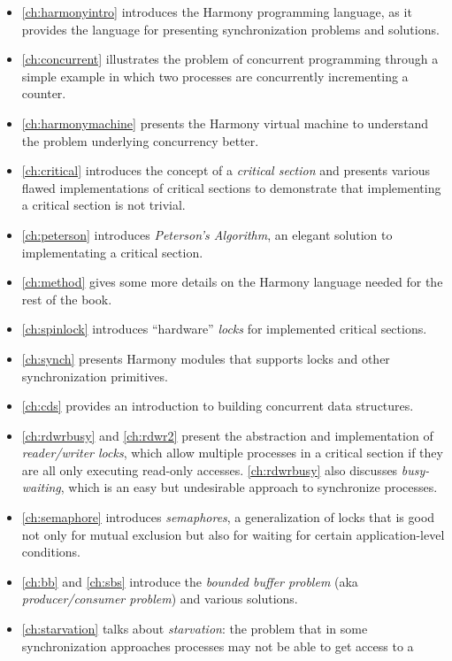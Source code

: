 \documentclass{report}
\begin{document}
\begin{itemize}
\item \autoref{ch:harmonyintro} introduces the Harmony programming
language, as it provides the language for presenting synchronization
problems and solutions.
\item \autoref{ch:concurrent} illustrates the problem of
concurrent programming through a simple example in which two processes
are concurrently incrementing a counter.
\item \autoref{ch:harmonymachine} presents the
Harmony virtual machine to understand the problem
underlying concurrency better.
\item \autoref{ch:critical} introduces the concept of a
\emph{critical section} and presents various flawed implementations
of critical sections to demonstrate that implementing a critical section
is not trivial.
\item \autoref{ch:peterson} introduces \emph{Peterson's Algorithm}, an
elegant solution to implementating a critical section.
\item \autoref{ch:method} gives some more details on the Harmony
language needed for the rest of the book.
\item \autoref{ch:spinlock} introduces ``hardware'' \emph{locks}
for implemented critical sections.
\item \autoref{ch:synch} presents Harmony modules
that supports locks and other synchronization primitives.
\item \autoref{ch:cds} provides an introduction to building concurrent
data structures.
\item \autoref{ch:rdwrbusy} and \autoref{ch:rdwr2} present the
abstraction and implementation of \emph{reader/writer locks},
which allow multiple processes in a critical section if they are
all only executing read-only accesses.
\autoref{ch:rdwrbusy} also discusses \emph{busy-waiting}, which is
an easy but undesirable approach to synchronize processes.
\item \autoref{ch:semaphore} introduces \emph{semaphores},
a generalization of locks
that is good not only for mutual exclusion but also for waiting for
certain application-level conditions.
\item \autoref{ch:bb} and \autoref{ch:sbs} introduce the
\emph{bounded buffer problem} (aka \emph{producer/consumer problem})
and various solutions.
\item \autoref{ch:starvation} talks about \emph{starvation}:
the problem that in some
synchronization approaches processes may not be able to get access to a

\end{itemize}
\end{document}
